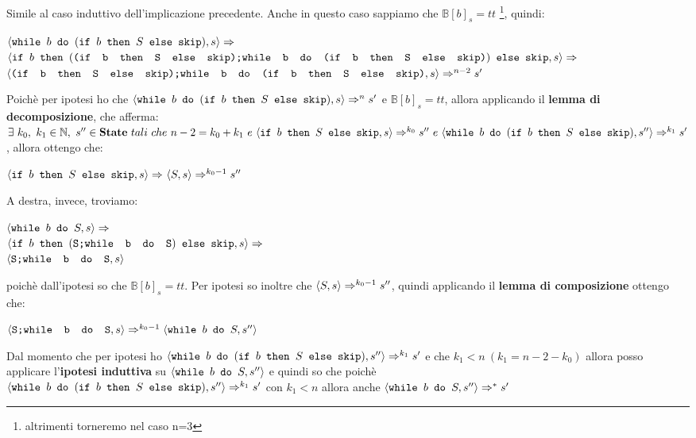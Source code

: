 {	 Simile al caso induttivo dell'implicazione precedente.
	Anche in questo caso sappiamo che $\mathbb{B}[b]_s=tt$
	\footnote{altrimenti torneremo nel caso n=3}, quindi:
	\begin{center}
	$\confSs{\wbS{b}{(\ifABC{b}{S}{\skipistr})}}{s}\Rar{}$\\
	$\confSs{
		\ifABC{b}
			{(\concat{(\ifABC{b}{S}{\skipistr})}
			{\wbS{b}{(\ifABC{b}{S}{\skipistr})}})}
			{\skipistr}
	}{s}\Rar{}$\\
	$\confSs{\concat{(\ifABC{b}{S}{\skipistr})}{\wbS{b}
	{(\ifABC{b}{S}{\skipistr})}}}{s}\Rar{n-2}s'$
	\end{center}
	Poichè per ipotesi ho che 
	$\confSs{\wbS{b}{(\ifABC{b}{S}{\skipistr})}}{s}\Rar{n}s'$ e 
	$\mathbb{B}[b]_s=tt$, allora applicando il \textbf{lemma di decomposizione},
	che afferma: $\exists{}~k_0,~k_1\in\mathbb{N},~s''\in\states~tali~che~n-2=
	k_0+k_1~e~\confSs{\ifABC{b}{S}{\skipistr}}{s}\Rar{k_0}s''~e~\confSs{\wbS{b}
	{(\ifABC{b}{S}{\skipistr})}}{s''}\Rar{k_1}s'$, allora ottengo che:
	\begin{center}
	$\confSs{\ifABC{b}{S}{\skipistr}}{s}\Rar{}\confSs{S}{s}\Rar{k_0-1}s''$
	\end{center}
	A destra, invece, troviamo:
	\begin{center}
	$\confSs{\wbS{b}{S}}{s}\Rar{}$\\
	$\confSs{
		\ifABC{b}
		{(\concat{S}
		{\wbS{b}{S}})}
		{\skipistr}}{s}\Rar{}$\\
	$\confSs{{\concat{S}{\wbS{b}{S}}}}{s}$
	\end{center}
	poichè dall'ipotesi so che $\mathbb{B}[b]_s=tt$. Per ipotesi so inoltre che
	$\confSs{S}{s}\Rar{k_0-1}s''$, quindi applicando il \textbf{lemma di
	composizione} ottengo che:
	\begin{center}
	$\confSs{{\concat{S}{\wbS{b}{S}}}}{s}\Rar{k_0-1}\confSs{\wbS{b}{S}}{s''}$
	\end{center}
	Dal momento che per ipotesi ho $\confSs{\wbS{b}{(\ifABC{b}{S}
	{\skipistr})}}{s''}\Rar{k_1}s'$ e che $k_1<n~(k_1=n-2-k_0)$ allora posso
	applicare l'\textbf{ipotesi induttiva} su $\confSs{\wbS{b}{S}}{s''}$ e
	quindi so che poichè \\ $\confSs{\wbS{b}{(\ifABC{b}{S}{\skipistr})}}
	{s''}\Rar{k_1}s'$ con $k_1<n$ allora anche 
	$\confSs{\wbS{b}{S}}{s''}\Rar{*}s'$
}
